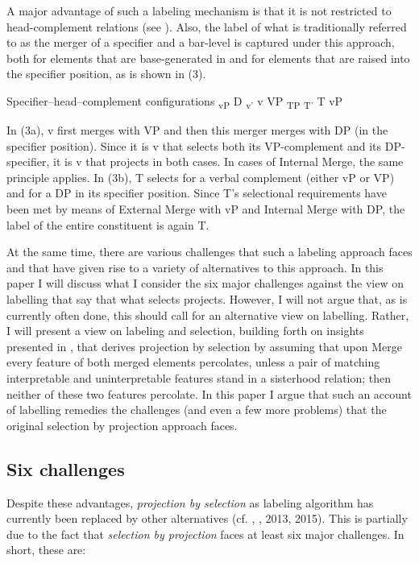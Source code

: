 \documentclass[output=paper
,modfonts
,nonflat]{langsci/langscibook}
\begin{document}
A major advantage of such a labeling mechanism is that it is not restricted to head-complement relations (see \citealt{Adger2003}). Also, the label of what is traditionally referred to as the merger of a specifier and a bar-level is captured under this approach, both for elements that are base-generated in and for elements that are raised into the specifier position, as is shown in (3).

\begin{exe}
	\ex Specifier–head–complement configurations
	\xlist
	\ex {\lbrack} \textsubscript{vP} D{\lbrack} \textsubscript{v'} v VP{\rbrack}{\rbrack}
	\ex {\lbrack} \textsubscript{TP}{\lbrack} \textsubscript{T'} T vP{\rbrack}{\rbrack}
	\endxlist
\end{exe}
In (3a), v first merges with VP and then this merger merges with DP (in the specifier position). Since it is v that selects both its VP-complement and its DP-specifier, it is v that projects in both cases. In cases of Internal Merge, the same principle applies. In (3b), T selects for a verbal complement (either vP or VP) and for a DP in its specifier position. Since T’s selectional requirements have been met by means of External Merge with vP and Internal Merge with DP, the label of the entire constituent is again T.

At the same time, there are various challenges that such a labeling approach faces and that have given rise to a variety of alternatives to this approach. In this paper I will discuss what I consider the six major challenges against the view on labelling that say that what selects projects. However, I will not argue that, as is currently often done, this should call for an alternative view on labelling. Rather, I will present a view on labeling and selection, building forth on insights presented in \citet{Adger2003}, that derives projection by selection by assuming that upon Merge every feature of both merged elements percolates, unless a pair of matching interpretable and uninterpretable features stand in a sisterhood relation; then neither of these two features percolate. In this paper I argue that such an account of labelling remedies the challenges (and even a few more problems) that the original selection by projection approach faces.

\subsection{Six challenges}
Despite these advantages, \textit{projection by selection} as labeling algorithm has currently been replaced by other alternatives (cf. \citealt{Collins2000}, \citealt{Chomsky2008}, 2013, 2015). This is partially due to the fact that \textit{selection by projection} faces at least six major challenges. In short, these are: 
\end{document}
